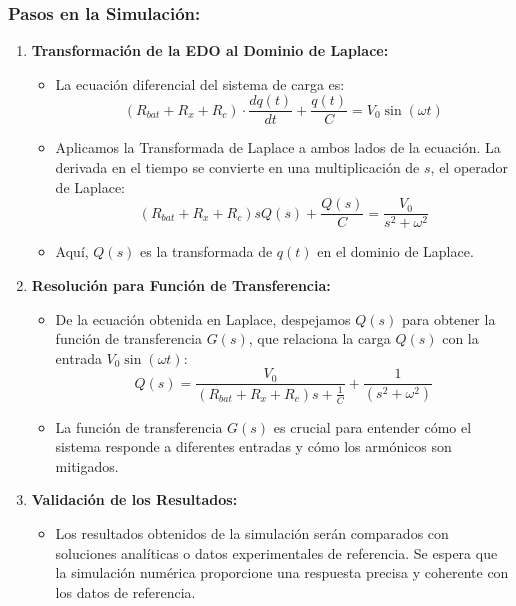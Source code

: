 \subsubsection*{Pasos en la Simulación:}
\begin{enumerate}
	\item \textbf{Transformación de la EDO al Dominio de Laplace:}
	      \begin{itemize}
		      \item La ecuación diferencial del sistema de carga es:
		            \[
			            (R_{bat} + R_x + R_c) \cdot \frac{dq(t)}{dt} + \frac{q(t)}{C} = V_0 \sin(\omega t)
		            \]
		      \item Aplicamos la Transformada de Laplace a ambos lados de la ecuación. La derivada en el tiempo se convierte en una multiplicación de \(s\), el operador de Laplace:
		            \[
			            (R_{bat} + R_x + R_c)sQ(s) + \frac{Q(s)}{C} = \frac{V_0}{s^2 + \omega^2}
		            \]
		      \item Aquí, \(Q(s)\) es la transformada de \(q(t)\) en el dominio de Laplace.
	      \end{itemize}

	\item \textbf{Resolución para Función de Transferencia:}
	      \begin{itemize}
		      \item De la ecuación obtenida en Laplace, despejamos \(Q(s)\) para obtener la función de transferencia \(G(s)\), que relaciona la carga \(Q(s)\) con la entrada \(V_0 \sin(\omega t)\):
		            \[
			            Q(s) = \frac{V_0}{ (R_{bat} + R_x + R_c)s + \frac{1}{C}} + \frac{1}{(s^2 + \omega^2)}
		            \]
		      \item La función de transferencia \(G(s)\) es crucial para entender cómo el sistema responde a diferentes entradas y cómo los armónicos son mitigados.
	      \end{itemize}

	\item \textbf{Validación de los Resultados:}
	      \begin{itemize}
		      \item Los resultados obtenidos de la simulación serán comparados con soluciones analíticas o datos experimentales de referencia. Se espera que la simulación numérica proporcione una respuesta precisa y coherente con los datos de referencia.
	      \end{itemize}
\end{enumerate}

